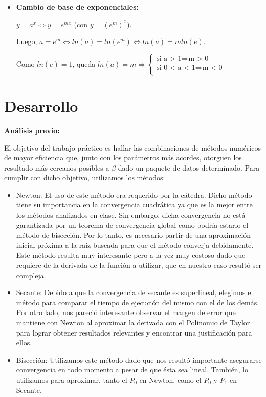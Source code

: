 \documentclass[10pt, a4paper]{article}
\begin{document}
\begin{itemize}
\item \textbf{Cambio de base de exponenciales:}\newline
\vspace*{0.3cm}
\centerline{$y = a^x \Leftrightarrow y = e^{mx}$ (con $y = (e^m)^x$).}
 \centerline{Luego, $a = e^m \Leftrightarrow ln(a) = ln(e^m) \Leftrightarrow ln(a) = mln(e)$.}
  \centerline{Como $ln(e) = 1$, queda $ln(a) = m \Rightarrow
  \left\lbrace
  \begin{array}{l}
     \text{si a > 1} \Rightarrow \text{m > 0} \\
     \text{si 0 < a < 1} \Rightarrow \text{m < 0} \\
  \end{array}
  \right.$}

\end{itemize}
\section{Desarrollo}

\large{\textbf{An\'alisis previo:}}

El objetivo del trabajo pr\'actico es hallar las combinaciones de m\'etodos num\'ericos de mayor eficiencia que, junto con los par\'ametros m\'as acordes, otorguen los resultado m\'as cercanos posibles a $\beta$ dado un paquete de datos determinado. Para cumplir con dicho objetivo, utilizamos los m\'etodos:

\begin{itemize}

\item Newton: El uso de este m\'etodo era requerido por la c\'atedra. Dicho m\'etodo tiene su importancia en la convergencia cuadr\'atica ya que es la mejor entre los m\'etodos analizados en clase. Sin embargo, dicha convergencia no est\'a garantizada por un teorema de convergencia global como podr\'ia estarlo el m\'etodo de bisecci\'on. Por lo tanto, es necesario partir de una aproximaci\'on inicial pr\'oxima a la ra\'iz buscada para que el m\'etodo converja debidamente. Este m\'etodo resulta muy interesante pero a la vez muy costoso dado que requiere de la derivada de la funci\'on a utilizar, que en nuestro caso result\'o ser compleja.

\item Secante: Debido a que la convergencia de secante es superlineal, elegimos el m\'etodo para comparar el tiempo de ejecuci\'on del mismo con el de los dem\'as. Por otro lado, nos pareci\'o interesante observar el margen de error que mantiene con Newton al aproximar la derivada con el Polinomio de Taylor para lograr obtener resultados relevantes y encontrar una justificaci\'on para ellos. 

\item Bisecci\'on: Utilizamos este m\'etodo dado que nos result\'o importante asegurarse convergencia en todo momento a pesar de que \'esta sea lineal. Tambi\'en, lo utilizamos para aproximar, tanto el $P_{0}$ en Newton, como el $P_{0}$ y $P_{1}$ en Secante.
\end{itemize}
\end{document}
